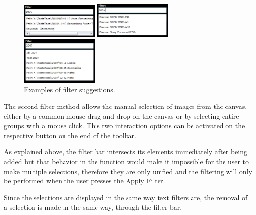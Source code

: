 \begin{figure}
	\vspace{-8pt}
	\begin{center}
		\includegraphics[width=0.34\textwidth]{Figures/filter_0000_geoc.png}

		\vspace{7pt}

		\includegraphics[width=0.34\textwidth]{Figures/filter_0001_sony.png}

		\vspace{7pt}

		\includegraphics[width=0.34\textwidth]{Figures/filter_0004_2007.png}
	\end{center}
	\vspace{-25pt}
	\caption{Examples of filter suggestions.}
	\vspace{-25pt}
	\label{fig:filter}
\end{figure}

The second filter method allows the manual selection of images from the canvas, either by a common mouse drag-and-drop on the canvas or by selecting entire groups with a mouse click. This two interaction options can be activated on the respective button on the end of the toolbar. 

As explained above, the filter bar intersects its elements immediately after being added but that behavior in the function would make it impossible for the user to make multiple selections, therefore they are only unified and the filtering will only be performed when the user presses the Apply Filter.

Since the selections are displayed in the same way text filters are, the removal of a selection is made in the same way, through the filter bar.



